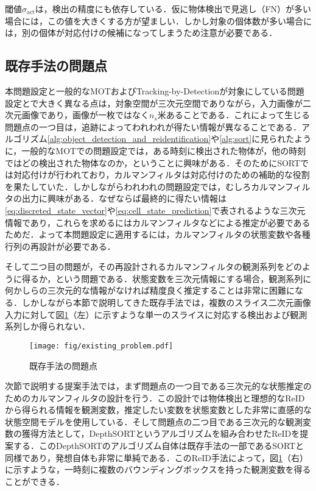    閾値$\sigma_{\text{act}}$は，検出の精度にも依存している．仮に物体検出で見逃し（FN）が多い場合には，この値を大きくする方が望ましい．しかし対象の個体数が多い場合には，別の個体が対応付けの候補になってしまうため注意が必要である．

    \subsection{既存手法の問題点}
    \label{subsec:existing_problem}

    本問題設定と一般的なMOTおよびTracking-by-Detectionが対象にしている問題設定とで大きく異なる点は，対象空間が三次元空間でありながら，入力画像が二次元画像であり，画像が一枚ではなく$n_s$米あることである．これによって生じる問題点の一つ目は，追跡によってわれわれが得たい情報が異なることである．アルゴリズム\ref{alg:object_detection_and_reidentification}や\ref{alg:sort}に見られたように，一般的なMOTでの問題設定では，ある時刻に検出された物体が，他の時刻ではどの検出された物体なのか，ということに興味がある．そのためにSORTでは対応付けが行われており，カルマンフィルタは対応付けのための補助的な役割を果たしていた．しかしながらわれわれの問題設定では，むしろカルマンフィルタの出力に興味がある．なぜならば最終的に得たい情報は\ref{eq:discreted_state_vector}や\ref{eq:cell_state_prediction}で表されるような三次元情報であり，これらを求めるにはカルマンフィルタなどによる推定が必要であるためだ．よって本問題設定に適用するには，カルマンフィルタの状態変数や各種行列の再設計が必要である．

    そして二つ目の問題が，その再設計されるカルマンフィルタの観測系列をどのように得るか，という問題である．状態変数を三次元情報にする場合，観測系列に何かしらの三次元的な情報がなければ精度良く推定することは非常に困難になる．しかしながら本節で説明してきた既存手法では，複数のスライス二次元画像入力に対して図\ref{fig:existing_problem}（左）に示すような単一のスライスに対応する検出および観測系列しか得られない．

    \begin{figure}[t]
        \centering
        \texttt{[image: fig/existing\_problem.pdf]}
        \caption[既存手法の問題点]{既存手法の問題点}
        \label{fig:existing_problem}
    \end{figure}

    次節で説明する提案手法では，まず問題点の一つ目である三次元的な状態推定のためのカルマンフィルタの設計を行う．この設計では物体検出と理想的なReIDから得られる情報を観測変数，推定したい変数を状態変数とした非常に直感的な状態空間モデルを使用している．そして問題点の二つ目である三次元的な観測変数の獲得方法として，DepthSORTというアルゴリズムを組み合わせたReIDを提案する．このDepthSORTのアルゴリズム自体は既存手法の一部であるSORTと同様であり，発想自体も非常に単純である．このReID手法によって，図\ref{fig:existing_problem}（右）に示すような，一時刻に複数のバウンディングボックスを持った観測変数を得ることができる．

